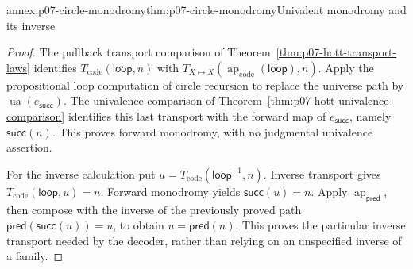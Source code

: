 \begin{annexitem}{annex:p07-circle-monodromy}{thm:p07-circle-monodromy}{Univalent monodromy and its inverse}
\begin{proof}
The pullback transport comparison of
Theorem~\ref{thm:p07-hott-transport-laws} identifies
\(T_{\mathrm{code}}(\mathsf{loop},n)\) with
\(T_{X\mapsto X}(\operatorname{ap}_{\mathrm{code}}(\mathsf{loop}),n)\).
Apply the propositional loop computation of circle recursion to replace
the universe path by \(\operatorname{ua}(e_{\mathsf{succ}})\).
The univalence comparison of
Theorem~\ref{thm:p07-hott-univalence-comparison} identifies this last
transport with the forward map of \(e_{\mathsf{succ}}\), namely
\(\mathsf{succ}(n)\). This proves forward monodromy, with no
judgmental univalence assertion.

For the inverse calculation put
\(u=T_{\mathrm{code}}(\mathsf{loop}^{-1},n)\).
Inverse transport gives
\(T_{\mathrm{code}}(\mathsf{loop},u)=n\).
Forward monodromy yields \(\mathsf{succ}(u)=n\).
Apply \(\operatorname{ap}_{\mathsf{pred}}\), then compose with the
inverse of the previously proved path
\(\mathsf{pred}(\mathsf{succ}(u))=u\), to obtain
\(u=\mathsf{pred}(n)\).
This proves the particular inverse transport needed by the decoder,
rather than relying on an unspecified inverse of a family.
\end{proof}
\end{annexitem}
